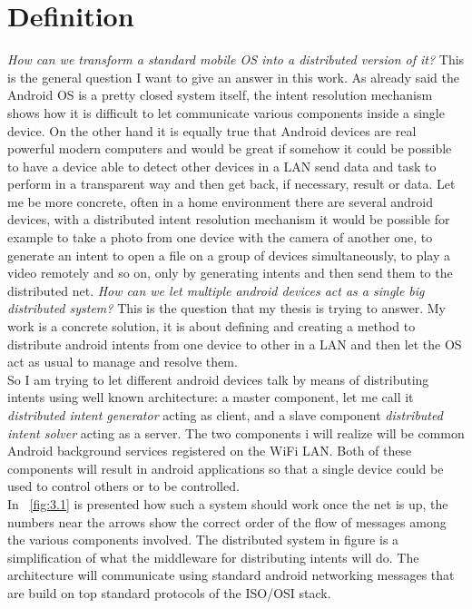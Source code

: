\section{Definition} \label{problemdefinition}
\textit{How can we transform a standard mobile OS into a distributed version of it?} This is the general question I want to give an answer in this work.
As already said the Android OS is a pretty closed system itself, the intent resolution mechanism shows how it is difficult to let communicate various components inside a single device. On the other hand it is equally true that Android devices are real powerful modern computers and would be great if somehow it could be possible to have a device able to detect other devices in a LAN send data and task to perform in a transparent way and then get back, if necessary, result or data. Let me be more concrete, often in a home environment there are several android devices, with a distributed intent resolution mechanism it would be possible for example to take a photo from one device with the camera of another one, to generate an intent to open a file on a group of devices simultaneously, to play a video remotely and so on, only by generating intents and then send them to the distributed net. \textit{How can we let multiple android devices act as a single big distributed system?} This is the question that my thesis is trying to answer. My work is a concrete solution, it is about defining and creating a method to distribute android intents from one device to other in a LAN and then let the OS act as usual to manage and resolve them.\\
So I am trying to let different android devices talk by means of distributing intents using  well known architecture: a master component, let me call it \textit{distributed intent generator} acting as client, and a slave component \textit{distributed intent solver} acting as a server. The two components i will realize will be common Android background services registered on the WiFi LAN. Both of these components will result in android applications so that a single device could be used to control others or to be controlled.\\
In \figurename~\ref{fig:3.1} is presented how such a system should work once the net is up, the numbers near the arrows show the correct order of the flow of messages among the various components involved. The distributed system in figure is a simplification of what the middleware for distributing intents will do. The architecture will communicate using standard android networking messages that are build on top standard protocols of the ISO/OSI stack.
 
